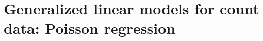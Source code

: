 \documentclass[]{book}\usepackage[]{graphicx}\usepackage[]{color}
\begin{document}
% 
% 
% 
% 
% 
% 
% 
% 
% 
% 
% 
% 
% 
% 
% 
% 








\chapter{Generalized linear models for count data: Poisson regression}\label{chap:poisson}
\end{document}
